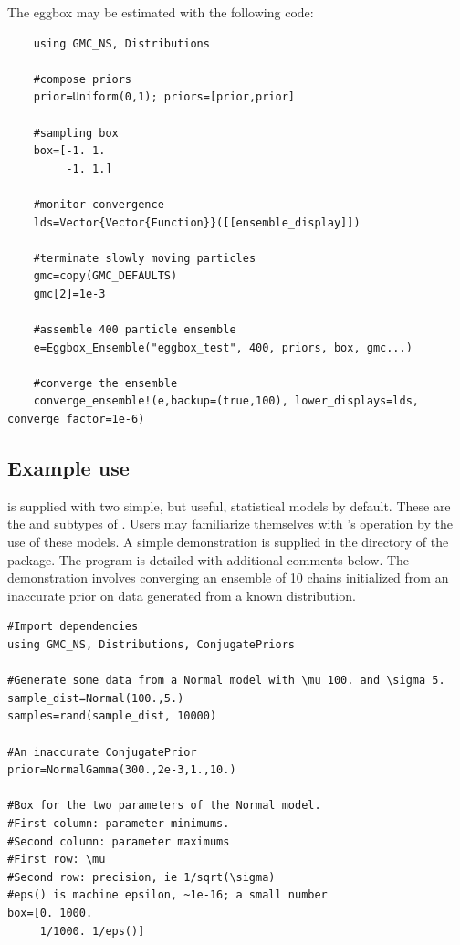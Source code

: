 \documentclass{ut-thesis}
\begin{document}
\begin{NoHyper}
The eggbox may be estimated with the following code:

\begin{verbatim}
    using GMC_NS, Distributions

    #compose priors
    prior=Uniform(0,1); priors=[prior,prior]

    #sampling box
    box=[-1. 1.
         -1. 1.]

    #monitor convergence
    lds=Vector{Vector{Function}}([[ensemble_display]])

    #terminate slowly moving particles
    gmc=copy(GMC_DEFAULTS)
    gmc[2]=1e-3

    #assemble 400 particle ensemble
    e=Eggbox_Ensemble("eggbox_test", 400, priors, box, gmc...)

    #converge the ensemble
    converge_ensemble!(e,backup=(true,100), lower_displays=lds, converge_factor=1e-6)
\end{verbatim}

\subsection{Example use}
 is supplied with two simple, but useful, statistical models by default. These are the  and  subtypes of . Users may familiarize themselves with 's operation by the use of these models. A simple demonstration is supplied in the  directory of the package. The program is detailed with additional comments below. The demonstration involves converging an ensemble of 10  chains initialized from an inaccurate  prior on data generated from a known  distribution.

\begin{verbatim}
#Import dependencies
using GMC_NS, Distributions, ConjugatePriors

#Generate some data from a Normal model with \mu 100. and \sigma 5. 
sample_dist=Normal(100.,5.)
samples=rand(sample_dist, 10000)

#An inaccurate ConjugatePrior
prior=NormalGamma(300.,2e-3,1.,10.) 

#Box for the two parameters of the Normal model.
#First column: parameter minimums.
#Second column: parameter maximums
#First row: \mu
#Second row: precision, ie 1/sqrt(\sigma)
#eps() is machine epsilon, ~1e-16; a small number
box=[0. 1000.
     1/1000. 1/eps()]


\end{verbatim}
\end{NoHyper}
\end{document}
